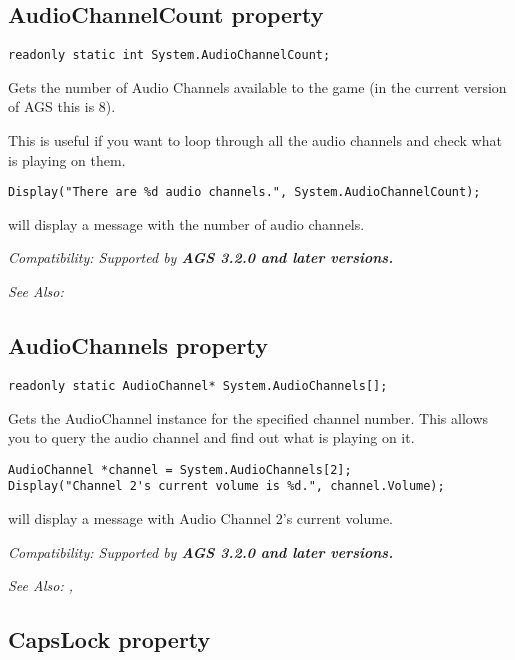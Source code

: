 \subsection{AudioChannelCount property}\label{System.AudioChannelCount}%

\begin{verbatim}
readonly static int System.AudioChannelCount;
\end{verbatim}
Gets the number of Audio Channels available to the game (in the current version of AGS this is 8).

This is useful if you want to loop through all the audio channels and check what is playing on them.

\begin{verbatim}
Display("There are %d audio channels.", System.AudioChannelCount);
\end{verbatim}
will display a message with the number of audio channels.

\it{Compatibility:} Supported by \bf{AGS 3.2.0} and later versions.

\it{See Also:} 


\subsection{AudioChannels property}\label{System.AudioChannels}%

\begin{verbatim}
readonly static AudioChannel* System.AudioChannels[];
\end{verbatim}
Gets the AudioChannel instance for the specified channel number. This allows you
to query the audio channel and find out what is playing on it.

\begin{verbatim}
AudioChannel *channel = System.AudioChannels[2];
Display("Channel 2's current volume is %d.", channel.Volume);
\end{verbatim}
will display a message with Audio Channel 2's current volume.

\it{Compatibility:} Supported by \bf{AGS 3.2.0} and later versions.

\it{See Also:} ,


\subsection{CapsLock property}\label{System.CapsLock}%

